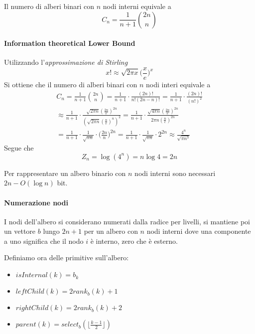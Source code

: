 \begin{theorem}
    Il numero di alberi binari con $n$ nodi interni equivale a
    $$C_n = \frac{1}{n+1}\binom{2n}{n}$$
\end{theorem}
\paragraph{Information theoretical Lower Bound}
Utilizzando l'\emph{approssimazione di Stirling}
$$x! \approx \sqrt{2\pi x}\bigg(\frac{x}{e}\bigg)^x $$
Si ottiene che il numero di alberi binari con $n$ nodi interi equivale a 
\begin{equation}
    \begin{aligned}
        C_n = \frac{1}{n+1}\binom{2n}{n} = \frac{1}{n+1}\cdot\frac{(2n)!}{n!(2n-n)!} 
        = \frac{1}{n+1}\cdot\frac{(2n)!}{(n!)^2} \\
        \approx \frac{1}{n+1}\cdot
        \frac{\sqrt{2\pi n}(\frac{2n}{e})^{2n}}{(\sqrt{2\pi n}(\frac{n}{e})^n)^2}
        = \frac{1}{n+1}\cdot \frac{\sqrt{4\pi n}(\frac{2n}{e})^{2n}}{2\pi n (\frac{n}{e})^{2n}}\\
        = \frac{1}{n+1} \cdot \frac{1}{\sqrt{\pi n}}\cdot \bigg(\frac{2n}{n}\bigg)^{2n}
        = \frac{1}{n+1}\cdot \frac{1}{\sqrt{\pi n}}\cdot 2^{2n} \approx \frac{4^n}{\sqrt{\pi n^3}}
    \end{aligned}
\end{equation}
Segue che $$Z_n = \log(4^n) = n\log 4 = 2n$$

\begin{theorem}
    Per rappresentare un albero binario con $n$ nodi interni sono necessari
    $2n - O(\log n)$ bit.
\end{theorem}

\paragraph{Numerazione nodi}
I nodi dell'albero si considerano numerati dalla radice per livelli, 
si mantiene poi un vettore $b$ lungo $2n +1$ per un albero con $n$ nodi interni
dove una componente a uno significa che il nodo $i$ è interno, zero che è esterno.

Definiamo ora delle primitive sull'albero:
\begin{itemize}
    \item $\mathit{isInternal(k)} = b_k$
    \item $\mathit{leftChild(k)} = 2\mathit{rank}_b(k) +1$
    \item $\mathit{rightChild(k)} = 2\mathit{rank}_b(k) +2$
    \item $\mathit{parent(k)} = \mathit{select}_b(\lfloor \frac{k-1}{2} \rfloor)$
\end{itemize}

